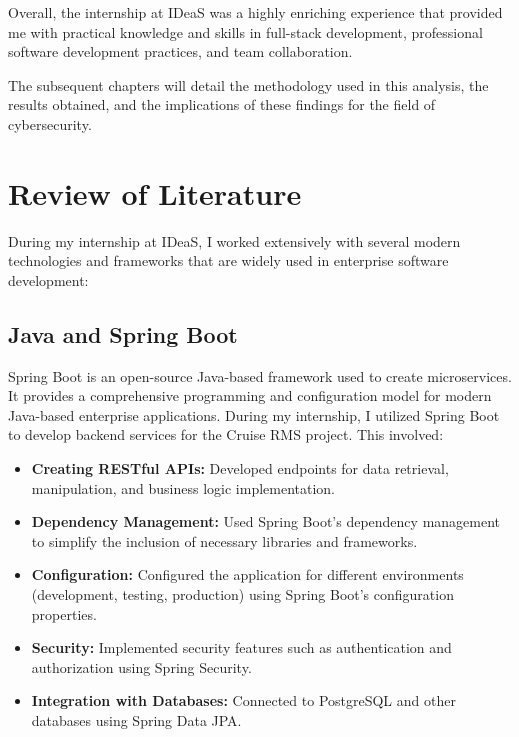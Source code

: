 \documentclass[openany, 11pt]{report} %
\begin{document}
Overall, the internship at IDeaS was a highly enriching experience that provided me with practical knowledge and skills in full-stack development, professional software development practices, and team collaboration.

The subsequent chapters will detail the methodology used in this analysis, the results obtained, and the implications of these findings for the field of cybersecurity.

\chapter{Review of Literature}
During my internship at IDeaS, I worked extensively with several modern technologies and frameworks that are widely used in enterprise software development:
\section{Java and Spring Boot}
Spring Boot is an open-source Java-based framework used to create microservices. It provides a comprehensive programming and configuration model for modern Java-based enterprise applications. During my internship, I utilized Spring Boot to develop backend services for the Cruise RMS project. This involved:
\begin{itemize}
    \item \textbf{Creating RESTful APIs:} Developed endpoints for data retrieval, manipulation, and business logic implementation.
    \item \textbf{Dependency Management:} Used Spring Boot's dependency management to simplify the inclusion of necessary libraries and frameworks.
    \item \textbf{Configuration:} Configured the application for different environments (development, testing, production) using Spring Boot's configuration properties.
    \item \textbf{Security:} Implemented security features such as authentication and authorization using Spring Security.
    \item \textbf{Integration with Databases:} Connected to PostgreSQL and other databases using Spring Data JPA.
\end{itemize}
\end{document}
